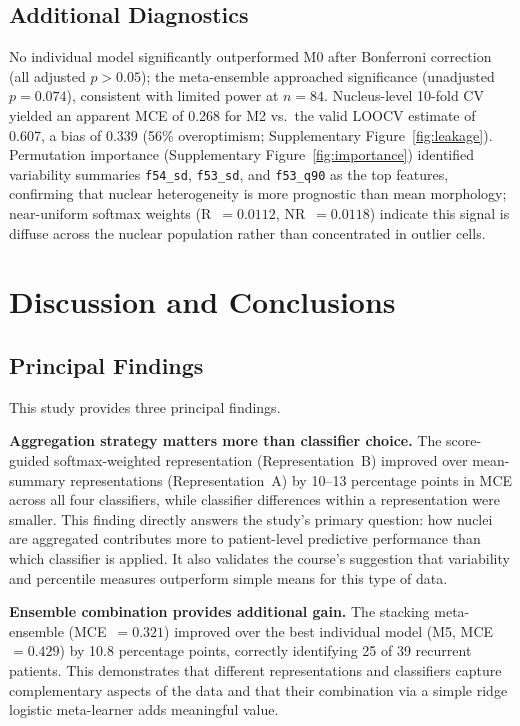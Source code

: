 \documentclass[12pt, onecolumn]{article}
\begin{document}
\subsection{Additional Diagnostics}
 
No individual model significantly outperformed M0 after Bonferroni correction (all adjusted $p > 0.05$); the meta-ensemble approached significance (unadjusted $p = 0.074$), consistent with limited power at $n = 84$. Nucleus-level 10-fold CV yielded an apparent MCE of 0.268 for M2 vs.\ the valid LOOCV estimate of 0.607, a bias of $\mathbf{0.339}$ (56\% overoptimism; Supplementary Figure~\ref{fig:leakage}). Permutation importance (Supplementary Figure~\ref{fig:importance}) identified variability summaries \texttt{f54\_sd}, \texttt{f53\_sd}, and \texttt{f53\_q90} as the top features, confirming that nuclear heterogeneity is more prognostic than mean morphology; near-uniform softmax weights (R~$= 0.0112$, NR~$= 0.0118$) indicate this signal is diffuse across the nuclear population rather than concentrated in outlier cells.

\section{Discussion and Conclusions}

\subsection{Principal Findings}

This study provides three principal findings.

\textbf{Aggregation strategy matters more than classifier
choice.} The score-guided softmax-weighted representation
(Representation~B) improved over mean-summary representations
(Representation~A) by 10--13 percentage points in MCE across
all four classifiers, while classifier differences within a
representation were smaller. This finding directly answers the
study's primary question: how nuclei are aggregated contributes
more to patient-level predictive performance than which classifier
is applied. It also validates the course's suggestion that
variability and percentile measures outperform simple means for
this type of data.

\textbf{Ensemble combination provides additional gain.} The
stacking meta-ensemble (MCE~$= 0.321$) improved over the best
individual model (M5, MCE~$= 0.429$) by 10.8 percentage points,
correctly identifying 25 of 39 recurrent patients. This
demonstrates that different representations and classifiers
capture complementary aspects of the data and that their
combination via a simple ridge logistic meta-learner adds
meaningful value.
\end{document}
